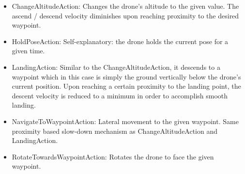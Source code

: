 \begin{itemize}
    \item ChangeAltitudeAction: Changes the drone's altitude to the given value. The ascend / descend velocity diminishes upon reaching proximity to the desired waypoint.
    \item HoldPoseAction: Self-explanatory: the drone holds the current pose for a given time.
    \item LandingAction: Similar to the ChangeAltitudeAction, it descends to a waypoint which in this case is simply the ground vertically below the drone's current position. Upon reaching a certain proximity to the landing point, the descent velocity is reduced to a minimum in order to accomplish smooth landing.
    \item NavigateToWaypointAction: Lateral movement to the given waypoint. Same proximity based slow-down mechanism as ChangeAltitudeAction and LandingAction.
    \item RotateTowardsWaypointAction: Rotates the drone to face the given waypoint.
\end{itemize}








